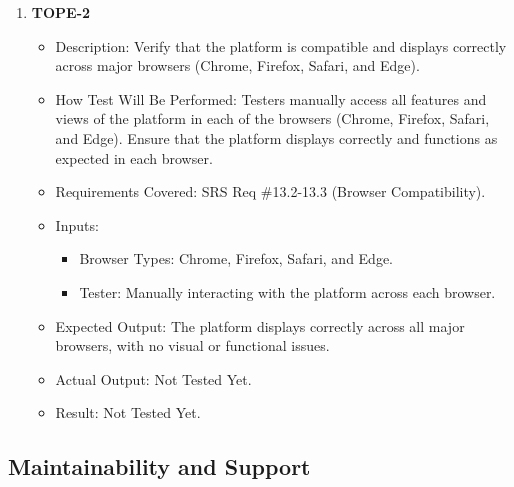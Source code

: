\documentclass[12pt, titlepage]{article}
\begin{document}
\begin{enumerate}
    \item \textbf{TOPE-2}  
    \begin{itemize}
        \item Description: Verify that the platform is compatible and displays correctly across major browsers (Chrome, Firefox, Safari, and Edge).
        \item How Test Will Be Performed: Testers manually access all features and views of the platform in each of the browsers (Chrome, Firefox, Safari, and Edge). Ensure that the platform displays correctly and functions as expected in each browser.
        \item Requirements Covered: SRS Req \#13.2-13.3 (Browser Compatibility).
        \item Inputs:  
            \begin{itemize}
                \item Browser Types: Chrome, Firefox, Safari, and Edge.
                \item Tester: Manually interacting with the platform across each browser.
            \end{itemize}
        \item Expected Output: The platform displays correctly across all major browsers, with no visual or functional issues.
        \item Actual Output: Not Tested Yet.
        \item Result: Not Tested Yet.
    \end{itemize}
\end{enumerate}

\subsection{Maintainability and Support}
\end{document}

